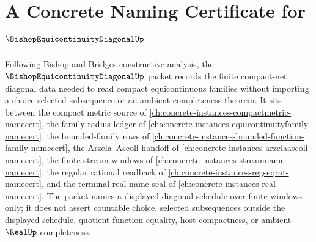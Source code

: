 \chapter{A Concrete Naming Certificate for $\BishopEquicontinuityDiagonalUp$}
\label{ch:concrete-instances-bishop-equicontinuity-diagonal-namecert}

Following Bishop and Bridges constructive analysis, the $\BishopEquicontinuityDiagonalUp$ packet records the finite compact-net diagonal data needed to read compact equicontinuous families without importing a choice-selected subsequence or an ambient completeness theorem. It sits between the compact metric source of \autoref{ch:concrete-instances-compactmetric-namecert}, the family-radius ledger of \autoref{ch:concrete-instances-equicontinuityfamily-namecert}, the bounded-family rows of \autoref{ch:concrete-instances-bounded-function-family-namecert}, the Arzela--Ascoli handoff of \autoref{ch:concrete-instances-arzelaascoli-namecert}, the finite stream windows of \autoref{ch:concrete-instances-streamname-namecert}, the regular rational readback of \autoref{ch:concrete-instances-regseqrat-namecert}, and the terminal real-name seal of \autoref{ch:concrete-instances-real-namecert}. The packet names a displayed diagonal schedule over finite windows only; it does not assert countable choice, selected subsequences outside the displayed schedule, quotient function equality, host compactness, or ambient $\RealUp$ completeness.

